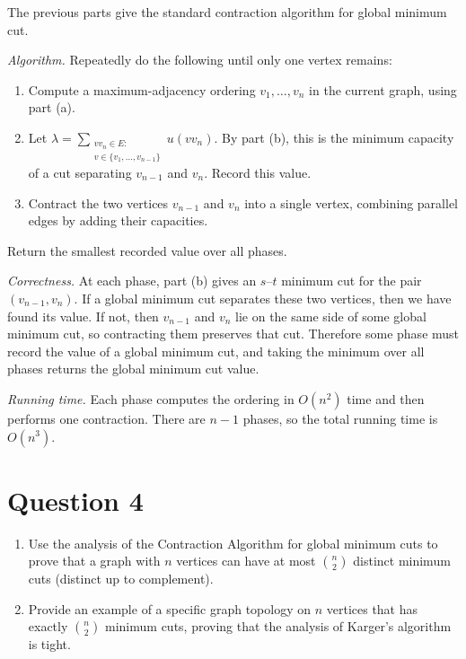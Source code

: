 \documentclass[letterpaper]{article}
\begin{document}
		\medskip
		
		\item[(c)] The previous parts give the standard contraction algorithm for global minimum cut.
		
		\medskip
		
		\textit{Algorithm.}
		Repeatedly do the following until only one vertex remains:
		
		\begin{enumerate}
			\item Compute a maximum-adjacency ordering
			$
			v_1,\ldots,v_n
			$
			in the current graph, using part (a).
			\item Let
			$
			\lambda = \sum_{\substack{v v_n \in E:\\ v \in \{v_1,\ldots,v_{n-1}\}}} u(vv_n).
			$
			By part (b), this is the minimum capacity of a cut separating $v_{n-1}$ and $v_n$.
			Record this value.
			\item Contract the two vertices $v_{n-1}$ and $v_n$ into a single vertex, combining
			parallel edges by adding their capacities.
		\end{enumerate}
		
		Return the smallest recorded value over all phases.
		
		\medskip
		
		\textit{Correctness.}
		At each phase, part (b) gives an $s$--$t$ minimum cut for the pair
		$(v_{n-1},v_n)$. If a global minimum cut separates these two vertices, then we
		have found its value. If not, then $v_{n-1}$ and $v_n$ lie on the same side of
		some global minimum cut, so contracting them preserves that cut. Therefore some
		phase must record the value of a global minimum cut, and taking the minimum over
		all phases returns the global minimum cut value.
		
		\medskip
		
		\textit{Running time.}
		Each phase computes the ordering in $O(n^2)$ time and then performs one contraction.
		There are $n-1$ phases, so the total running time is
		$
		O(n^3).
		$
		
		
		\clearpage
		
		\section{Question 4}
		
		\begin{enumerate}
			\item[(a)] Use the analysis of the Contraction Algorithm for global minimum cuts
			to prove that a graph with $n$ vertices can have at most $\binom{n}{2}$
			distinct minimum cuts (distinct up to complement).
			
			\item[(b)] Provide an example of a specific graph topology on $n$ vertices that has
			exactly $\binom{n}{2}$ minimum cuts, proving that the analysis of Karger's
			algorithm is tight.
		\end{enumerate}
	
\end{document}

